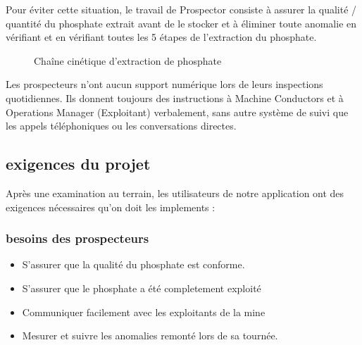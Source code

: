 Pour \'eviter cette situation, le travail de Prospector consiste \`a assurer la qualit\'e / quantit\'e du phosphate extrait avant de le stocker et \`a \'eliminer toute anomalie en v\'erifiant et en v\'erifiant toutes les 5 \'etapes de l'extraction du phosphate.

\begin{figure}[!htb]
	\caption{\label{fig:my-label} Cha\^ine cin\'etique d'extraction de phosphate}
\end{figure}

Les prospecteurs n'ont aucun support num\'erique lors de leurs inspections quotidiennes. Ils donnent toujours des instructions \`a Machine Conductors et \`a Operations Manager (Exploitant) verbalement, sans autre syst\`eme de suivi que les appels t\'el\'ephoniques ou les conversations directes.

{\color{red}{Comment pouvons-nous aider les prospecteurs \`a relever et \`a garder trace des anomalies au cours de leur inspection quotidienne pour \'eviter les souillures au phosphate?}}

\subsection{exigences du projet}
Apr\`es une examination au terrain, les utilisateurs de notre application ont des exigences n\'ecessaires qu'on doit les implements :
\subsubsection{besoins des prospecteurs}
\begin{itemize}
\item S'assurer que la qualit\'e du phosphate est conforme.
\item S'assurer que le phosphate a \'et\'e completement exploit\'e
\item Communiquer facilement avec les exploitants de la mine
\item Mesurer et suivre les anomalies remont\'e lors de sa tourn\'ee.
\end{itemize}
